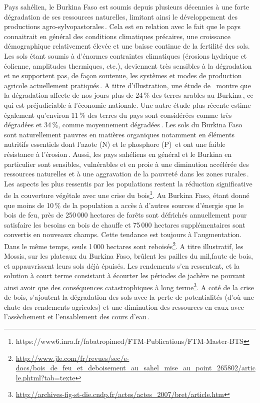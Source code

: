 \documentclass[a4paper,11pt]{article}
\begin{document}
Pays sahélien, le Burkina Faso est soumis depuis plusieurs décennies à
une forte dégradation de ses ressources naturelles, limitant ainsi le
développement des productions
agro-sylvopastorales\,\cite{Thiombiano_2000}. Cela est en relation
avec le fait que le pays connaitrait en général des conditions
climatiques précaires, une croissance démographique relativement
élevée et une baisse continue de la fertilité des sols. Les sols étant
soumis à d’énormes contraintes climatiques (érosions hydrique et
éolienne, amplitudes thermiques, etc.), deviennent très sensibles à la
dégradation et ne supportent pas, de façon soutenue, les systèmes et
modes de production agricole actuellement
pratiqués\,\cite{PANA_2003}. A titre d’illustration, une étude de
\,\citeauthor{INERA_2003} montre que la dégradation affecte de nos jours plus de
24\,\% des terres arables au Burkina\,\cite{INERA_2003}, ce qui est
préjudiciable à l’économie nationale. Une autre étude plus récente estime
également qu’environ 11\,\% des terres du pays sont considérées comme
très dégradées et 34\,\%, comme moyennement dégradées\,\cite{SPCONEDD_2006}.
Les sols du Burkina Faso sont naturellement pauvres en
matières organiques notamment en éléments nutritifs essentiels dont
l’azote (N) et le phosphore (P)\,\cite{Traore_2008} et ont
une faible résistance à l’érosion\,\cite{Berger_1991}. Aussi, les
pays sahéliens en général et le Burkina en particulier sont sensibles,
vulnérables et en proie à une diminution accélérée des ressources
naturelles et à une aggravation de la pauvreté dans les zones
rurales\,\cite{Roose_2004}. Les aspects les plus ressentis par les
populations restent la réduction significative de la couverture
végétale avec une crise du
bois\footnote{https://www6.inra.fr/fabatropimed/FTM-Publications/FTM-Master-BTS}.
Au Burkina Faso, étant donné que moins de 10\,\% de la population a
accès à d’autres sources d’énergie que le bois de feu, près de 250\,000
hectares de forêts sont défrichés annuellement pour satisfaire les
besoins en bois de chauffe et 75\,000 hectares supplémentaires sont
convertis en nouveaux champs. Cette tendance est toujours à
l’augmentation. Dans le même temps, seuls 1\,000 hectares sont
reboisés\footnote{\url{http://www.jle.com/fr/revues/sec/e-docs/bois_de_feu_et_deboisement_au_sahel_mise_au_point_265802/article.phtml?tab=texte}}. A
titre illustratif, les Mossis, sur les plateaux du Burkina Faso,
brûlent les pailles du mil,faute de bois, et appauvrissent leurs sols
déjà épuisés. Les rendements s’en ressentent, et la solution à court
terme consistant à écourter les périodes de jachère ne pouvant ainsi
avoir que des conséquences catastrophiques à long
terme\footnote{\url{http://archives-fig-st-die.cndp.fr/actes/actes_2007/bret/article.htm}}.
A coté de la crise de bois, s’ajoutent la dégradation des sols avec la
perte de potentialités (d’où une chute des rendements agricoles) et
une diminution des ressources en eaux avec l’assèchement et
l’ensablement des cours d’eau\,\cite{ZOMBRE_2006}.
\end{document}
